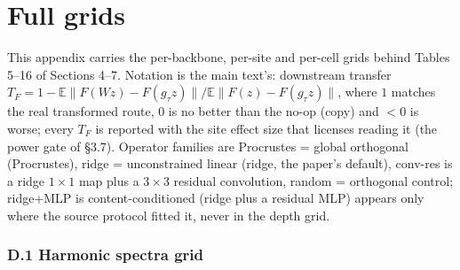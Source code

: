 \section{Full grids}

This appendix carries the per-backbone, per-site and per-cell grids behind Tables 5--16 of Sections 4--7. Notation is the main text's: downstream transfer $T_F = 1 - \mathbb E\lVert F(Wz)-F(g_\tau z)\rVert / \mathbb E\lVert F(z)-F(g_\tau z)\rVert$, where $1$ matches the real transformed route, $0$ is no better than the no-op (copy) and $<0$ is worse; every $T_F$ is reported with the site effect size that licenses reading it (the power gate of \S{}3.7). Operator families are Procrustes = global orthogonal (Procrustes), ridge = unconstrained linear (ridge, the paper's default), conv-res is a ridge $1\times1$ map plus a $3\times3$ residual convolution, random = orthogonal control; ridge+MLP is content-conditioned (ridge plus a residual MLP) appears only where the source protocol fitted it, never in the depth grid.

\subsubsection*{D.1 Harmonic spectra grid}


